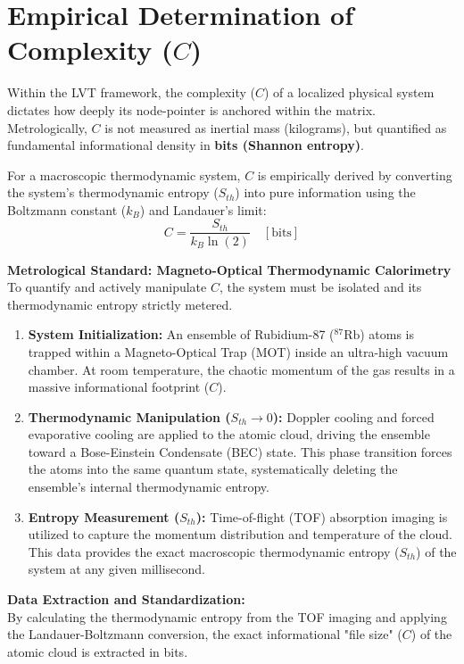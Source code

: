 \documentclass[12pt,a4paper]{article}
\begin{document}
\section{Empirical Determination of Complexity ($C$)}
Within the LVT framework, the complexity ($C$) of a localized physical system dictates how deeply its node-pointer is anchored within the matrix. Metrologically, $C$ is not measured as inertial mass (kilograms), but quantified as fundamental informational density in \textbf{bits (Shannon entropy)}. 

For a macroscopic thermodynamic system, $C$ is empirically derived by converting the system's thermodynamic entropy ($S_{th}$) into pure information using the Boltzmann constant ($k_B$) and Landauer's limit:
\begin{equation}
C = \frac{S_{th}}{k_B \ln(2)} \quad [\text{bits}]
\end{equation}

\textbf{Metrological Standard: Magneto-Optical Thermodynamic Calorimetry} \\
To quantify and actively manipulate $C$, the system must be isolated and its thermodynamic entropy strictly metered. 

\begin{enumerate}
    \item \textbf{System Initialization:} An ensemble of Rubidium-87 ($^{87}\text{Rb}$) atoms is trapped within a Magneto-Optical Trap (MOT) inside an ultra-high vacuum chamber. At room temperature, the chaotic momentum of the gas results in a massive informational footprint ($C$).
    \item \textbf{Thermodynamic Manipulation ($S_{th} \to 0$):} Doppler cooling and forced evaporative cooling are applied to the atomic cloud, driving the ensemble toward a Bose-Einstein Condensate (BEC) state. This phase transition forces the atoms into the same quantum state, systematically deleting the ensemble's internal thermodynamic entropy.
    \item \textbf{Entropy Measurement ($S_{th}$):} Time-of-flight (TOF) absorption imaging is utilized to capture the momentum distribution and temperature of the cloud. This data provides the exact macroscopic thermodynamic entropy ($S_{th}$) of the system at any given millisecond.
\end{enumerate}

\textbf{Data Extraction and Standardization:} \\
By calculating the thermodynamic entropy from the TOF imaging and applying the Landauer-Boltzmann conversion, the exact informational "file size" ($C$) of the atomic cloud is extracted in bits. 
\end{document}
